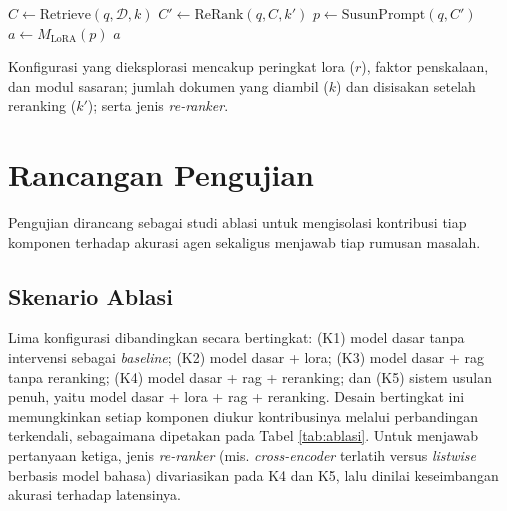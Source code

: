 \begin{algorithm}[H]
\caption{Alur Inferensi SLM dengan LoRA dan Re-ranked RAG pada Agen}
\label{alg:pipeline}
\begin{algorithmic}[1]
    \State $C \gets \text{Retrieve}(q, \mathcal{D}, k)$ 
    \State $C' \gets \text{ReRank}(q, C, k')$ 
    \State $p \gets \text{SusunPrompt}(q, C')$ 
    \State $a \gets M_{\text{LoRA}}(p)$ 
    \State \Return $a$
\EndProcedure
\end{algorithmic}
\end{algorithm}

Konfigurasi yang dieksplorasi mencakup peringkat \gls{lora} ($r$), faktor penskalaan, dan modul sasaran; jumlah dokumen yang diambil ($k$) dan disisakan setelah \gls{reranking} ($k'$); serta jenis \textit{re-ranker}. %

\section{Rancangan Pengujian}
Pengujian dirancang sebagai studi ablasi untuk mengisolasi kontribusi tiap komponen terhadap akurasi agen sekaligus menjawab tiap rumusan masalah.

\subsection{Skenario Ablasi}
Lima konfigurasi dibandingkan secara bertingkat: (K1) model dasar tanpa intervensi sebagai \textit{baseline}; (K2) model dasar + \gls{lora}; (K3) model dasar + \gls{rag} tanpa \gls{reranking}; (K4) model dasar + \gls{rag} + \gls{reranking}; dan (K5) sistem usulan penuh, yaitu model dasar + \gls{lora} + \gls{rag} + \gls{reranking}. Desain bertingkat ini memungkinkan setiap komponen diukur kontribusinya melalui perbandingan terkendali, sebagaimana dipetakan pada Tabel \ref{tab:ablasi}. Untuk menjawab pertanyaan ketiga, jenis \textit{re-ranker} (mis. \textit{cross-encoder} terlatih versus \textit{listwise} berbasis model bahasa) divariasikan pada K4 dan K5, lalu dinilai keseimbangan akurasi terhadap latensinya.


